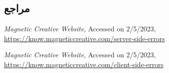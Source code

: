 {\subsection*{مراجع}

\begin{latin}
	\begingroup
	\renewcommand{\section}[2]{}%
	
\begin{thebibliography}{9}
	\textit{Magnetic Creative Website},
        Accessed on 2/5/2023,
        \url{https://know.magneticcreative.com/server-side-errors}
	
	\textit{Magnetic Creative Website},
	Accessed on 2/5/2023,
	\url{https://know.magneticcreative.com/client-side-errors}

\end{thebibliography}
\endgroup
\end{latin}

}

